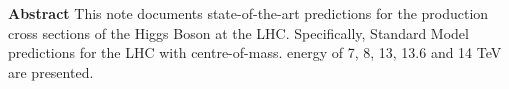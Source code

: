\documentclass[11pt]{report}
\begin{document}
\begin{center}



\textbf{}
	\end{center}

        \thispagestyle{empty}




\mbox{}\vspace*{3em}
%
\begin{center}
    \textbf{Abstract}
 This note documents state-of-the-art predictions for the production cross sections of the Higgs Boson at the LHC. 
 Specifically, Standard Model predictions for the LHC with centre-of-mass. energy of 7, 8, 13, 13.6 and 14 TeV are presented.
\end{center}
%

\newpage

\end{document}
